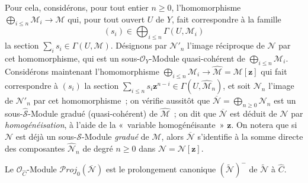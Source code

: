 \begin{env}[8.13.2]
\label{II.8.13.2-fr}
Pour cela, considérons, pour tout entier $n\geqslant0$, l'homomorphisme
$\bigoplus_{i\leqslant n}\mathcal{M}_i\to\mathcal{M}$ qui, pour tout ouvert
$U$ de $Y$, fait correspondre à la famille
\[
  (s_i)\in\bigoplus_{i\leqslant n}\Gamma(U,\mathcal{M}_i)
\]
la section $\sum_i s_i\in\Gamma(U,\mathcal{M})$. Désignons par
$\mathcal{N}'_n$ l'image réciproque de $\mathcal{N}$ par cet homomorphisme,
qui est un sous-$\mathcal{O}_Y$-Module quasi-cohérent de
$\bigoplus_{i\leqslant n}\mathcal{M}_i$. Considérons maintenant
l'homomorphisme
$\bigoplus_{i\leqslant n}\mathcal{M}_i\to
\widehat{\mathcal{M}}=\mathcal{M}[\mathbf{z}]$ qui fait correspondre à $(s_i)$ la
section
$\sum_{i\leqslant n}s_i \mathbf{z}^{n-i}\in\Gamma(U,\widehat{\mathcal{M}}_n)$, et
soit $\mathcal{N}_n$ l'image de $\mathcal{N}'_n$ par cet homomorphisme~; on
vérifie aussitôt que
$\overline{\mathcal{N}}=\bigoplus_{n\geqslant0}\mathcal{N}_n$ est un
sous-$\widehat{\mathcal{S}}$-Module gradué (quasi-cohérent) de
$\widehat{\mathcal{M}}$~; on dit que $\overline{\mathcal{N}}$ est déduit de
$\mathcal{N}$ par \emph{homogénéisation}, à l'aide de la «~variable
homogénéisante~» $\mathbf{z}$. On notera
que si $\mathcal{N}$ est déjà un sous-$\mathcal{S}$-Module \emph{gradué} de
$\mathcal{M}$, alors $\overline{\mathcal{N}}$ s'identifie à la somme directe
des composantes $\widehat{\mathcal{N}}_n$ de degré $n\geqslant0$ dans
$\widehat{\mathcal{N}}=\mathcal{N}[\mathbf{z}]$.
\end{env}

\begin{proposition}[8.13.3]
\label{II.8.13.3-fr}
Le $\mathcal{O}_{\widehat{C}}$-Module
$\mathcal{P}\mathit{roj}_0(\overline{\mathcal{N}})$ est le prolongement canonique
$(\widetilde{\mathcal{N}})^{-}$ de $\widetilde{\mathcal{N}}$ à
$\widehat{C}$.
\end{proposition}

